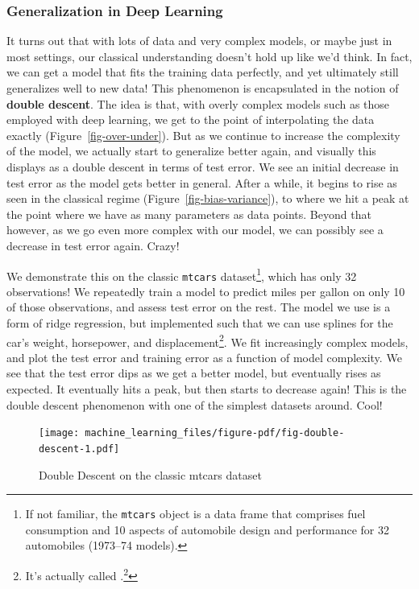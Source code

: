 \documentclass[
  letterpaper,
]{krantz}
\DeclareRobustCommand{\href}[2]{#2\footnote{\url{#1}}}
\begin{document}
\subsubsection{Generalization in Deep
Learning}\label{generalization-in-deep-learning}

It turns out that with lots of data and very complex models, or maybe
just in most settings, our classical understanding doesn't hold up like
we'd think. In fact, we can get a model that fits the training data
perfectly, and yet ultimately still generalizes well to new data! This
phenomenon is encapsulated in the notion of \textbf{double descent}. The
idea is that, with overly complex models such as those employed with
deep learning, we get to the point of interpolating the data exactly
(Figure~\ref{fig-over-under}). But as we continue to increase the
complexity of the model, we actually start to generalize better again,
and visually this displays as a double descent in terms of test error.
We see an initial decrease in test error as the model gets better in
general. After a while, it begins to rise as seen in the classical
regime (Figure~\ref{fig-bias-variance}), to where we hit a peak at the
point where we have as many parameters as data points. Beyond that
however, as we go even more complex with our model, we can possibly see
a decrease in test error again. Crazy!

We demonstrate this on the classic \texttt{mtcars} dataset\footnote{If
  not familiar, the \texttt{mtcars} object is a data frame that
  comprises fuel consumption and 10 aspects of automobile design and
  performance for 32 automobiles (1973--74 models).}, which has only 32
observations! We repeatedly train a model to predict miles per gallon on
only 10 of those observations, and assess test error on the rest. The
model we use is a form of ridge regression, but implemented such that we
can use splines for the car's weight, horsepower, and
displacement\footnote{It's actually called
  \href{https://www.stat.berkeley.edu/%7Eryantibs/statlearn-s23/lectures/ridgeless.pdf}{\emph{ridgeless}
  regression}.}. We fit increasingly complex models, and plot the test
error and training error as a function of model complexity. We see that
the test error dips as we get a better model, but eventually rises as
expected. It eventually hits a peak, but then starts to decrease again!
This is the double descent phenomenon with one of the simplest datasets
around. Cool!

\begin{figure}

{\centering \texttt{[image: machine\_learning\_files/figure-pdf/fig-double-descent-1.pdf]}

}

\caption{\label{fig-double-descent}Double Descent on the classic mtcars
dataset}

\end{figure}
\end{document}
